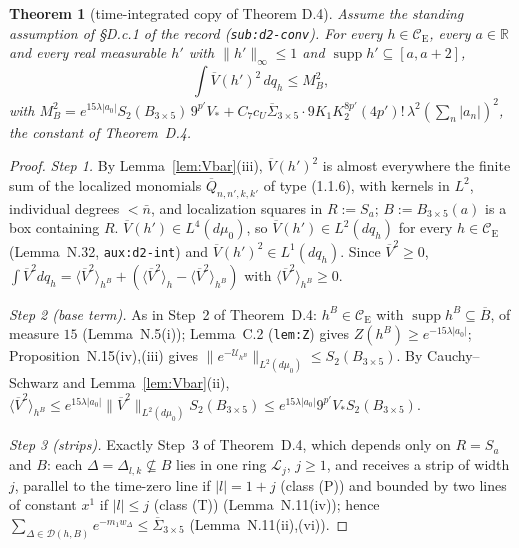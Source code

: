 \documentclass[11pt,a4paper]{article}
\newcommand{\R}{\mathbb{R}}
\newcommand{\CE}{\mathcal{C}_{\mathrm E}}
\DeclareMathOperator{\supp}{supp}
\newcommand{\ev}[2]{\langle #1\rangle_{#2}}
\newcommand{\Uc}{\mathcal U}
\newcommand{\dmu}{d\mu_0}
\newcommand{\Vb}{\overline V}                 %
\theoremstyle{plain}
\newtheorem{ttheorem}[tlemma]{Theorem}
\theoremstyle{definition}
\begin{document}
\begin{ttheorem}[time-integrated copy of Theorem D.4]\label{thm:TD4}
Assume the standing assumption of \S D.c.1 of the record (\texttt{sub:d2-conv}).  For every
$h\in\CE$, every $a\in\R$ and every real measurable $h'$ with $\|h'\|_\infty\le1$ and
$\supp h'\subseteq[a,a+2]$,
\[
 \int\Vb(h')^2\,dq_h\le M_B^2 ,
\]
with $M_B^2=e^{15\lambda|a_0|}S_2(B_{3\times5})\,9^{p'}V_*+C_7c_U\overline\Sigma_{3\times5}\cdot
9K_1K_2^{8p'}(4p')!\,\lambda^2(\sum_n|a_n|)^2$, the constant of Theorem~D.4.
\end{ttheorem}

\begin{proof}
\emph{Step 1.}  By Lemma~\ref{lem:Vbar}(iii), $\Vb(h')^2$ is almost everywhere the finite sum
of the localized monomials $\overline Q_{n,n',k,k'}$ of type (1.1.6), with kernels in $L^2$,
individual degrees $<\bar n$, and localization squares in $R:=S_a$; $B:=B_{3\times5}(a)$ is a
box containing $R$.  $\Vb(h')\in L^4(\dmu)$, so $\Vb(h')\in L^2(dq_h)$ for every $h\in\CE$
(Lemma~N.32, \texttt{aux:d2-int}) and $\Vb(h')^2\in L^1(dq_h)$.  Since $\Vb^2\ge0$,
$\int\Vb^2dq_h=\ev{\Vb^2}{h^B}+(\ev{\Vb^2}{h}-\ev{\Vb^2}{h^B})$ with $\ev{\Vb^2}{h^B}\ge0$.

\emph{Step 2 (base term).}  As in Step~2 of Theorem~D.4: $h^B\in\CE$ with $\supp
h^B\subseteq\overline B$, of measure $15$ (Lemma~N.5(i)); Lemma~C.2 (\texttt{lem:Z}) gives
$Z(h^B)\ge e^{-15\lambda|a_0|}$; Proposition~N.15(iv),(iii) gives
$\|e^{-\Uc_{h^B}}\|_{L^2(\dmu)}\le S_2(B_{3\times5})$.  By Cauchy--Schwarz and
Lemma~\ref{lem:Vbar}(ii),
$\ev{\Vb^2}{h^B}\le e^{15\lambda|a_0|}\|\Vb^2\|_{L^2(\dmu)}S_2(B_{3\times5})\le
e^{15\lambda|a_0|}9^{p'}V_*S_2(B_{3\times5})$.

\emph{Step 3 (strips).}  Exactly Step~3 of Theorem~D.4, which depends only on $R=S_a$ and $B$:
each $\Delta=\Delta_{l,k}\not\subseteq B$ lies in one ring $\mathcal L_j$, $j\ge1$, and receives
a strip of width $j$, parallel to the time-zero line if $|l|=1+j$ (class (P)) and bounded by two
lines of constant $x^1$ if $|l|\le j$ (class (T)) (Lemma~N.11(iv)); hence
$\sum_{\Delta\in\mathcal D(h,B)}e^{-m_1w_\Delta}\le\overline\Sigma_{3\times5}$
(Lemma~N.11(ii),(vi)).


\end{proof}
\end{document}
